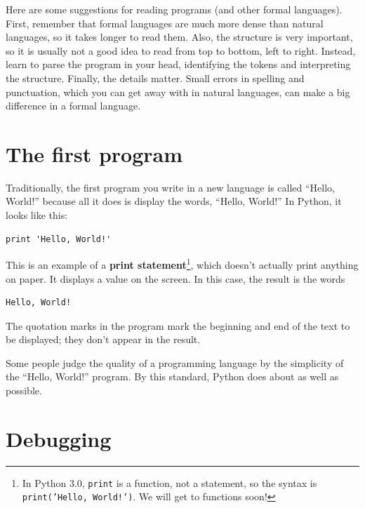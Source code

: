 \documentclass[10pt]{book}
\begin{document}
Here are some suggestions for reading programs (and other formal
languages).  First, remember that formal languages are much more dense
than natural languages, so it takes longer to read them.  Also, the
structure is very important, so it is usually not a good idea to read
from top to bottom, left to right.  Instead, learn to parse the
program in your head, identifying the tokens and interpreting the
structure.  Finally, the details matter.  Small errors in
spelling and punctuation, which you can get away
with in natural languages, can make a big difference in a formal
language.

\section{The first program}
\label{hello}


Traditionally, the first program you write in a new language
is called ``Hello, World!'' because all it does is display the
words, ``Hello, World!''  In Python, it looks like this:

\beforeverb
\begin{verbatim}
print 'Hello, World!'
\end{verbatim}
\afterverb
%
This is an example of a {\bf print statement}\footnote{In Python 3.0,
  {\tt print} is a function, not a statement, so the syntax is {\tt
    print('Hello, World!')}.  We will get to functions soon!}, which
doesn't actually print anything on paper.  It displays a value on the
screen.  In this case, the result is the words


\beforeverb
\begin{verbatim}
Hello, World!
\end{verbatim}
\afterverb
%
The quotation marks in the program mark the beginning and end
of the text to be displayed; they don't appear in the result.


Some people judge the quality of a programming language by the
simplicity of the ``Hello, World!'' program.  By this standard, Python
does about as well as possible.


\section{Debugging}
\end{document}
